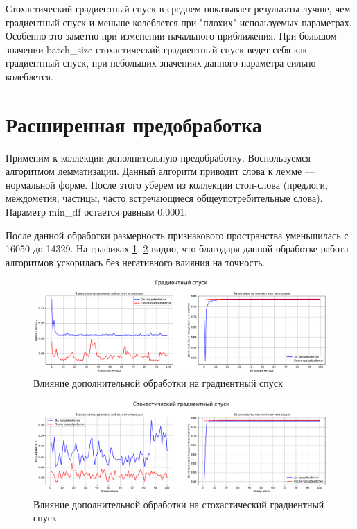 \documentclass{article}
\begin{document}



Стохастический градиентный спуск в среднем показывает результаты лучше, чем градиентный спуск и меньше колеблется при "плохих"{ }используемых параметрах. Особенно это заметно при изменении начального приближения. При большом значении batch\_size стохастический градиентный спуск ведет себя как градиентный спуск, при небольших значениях данного параметра сильно колеблется.

\section{Расширенная предобработка}

Применим к коллекции дополнительную предобработку. Воспользуемся алгоритмом лемматизации. Данный алгоритм приводит слова к лемме — нормальной форме. После этого уберем из коллекции стоп-слова (предлоги, междометия, частицы, часто встречающиеся общеупотребительные слова). Параметр min\_df остается равным 0.0001. 

После данной обработки размерность признакового пространства уменьшилась с 16050 до 14329. На графиках \ref{fig:GDC_before_and_after}, \ref{fig:SGDC_before_and_after} видно, что благодаря данной обработке работа алгоритмов ускорилась без негативного влияния на точность.

\begin{figure}[H]
	\centering
	\includegraphics[width=15cm]{TASK2 GDC before and after.pdf}
	\caption{Влияние дополнительной обработки на градиентный спуск}
	\label{fig:GDC_before_and_after}
\end{figure}
\begin{figure}[H]
	\centering
	\includegraphics[width=15cm]{TASK2 SGDC before and after.pdf}
	\caption{Влияние дополнительной обработки на стохастический градиентный спуск}
	\label{fig:SGDC_before_and_after}
\end{figure}
\end{document}
